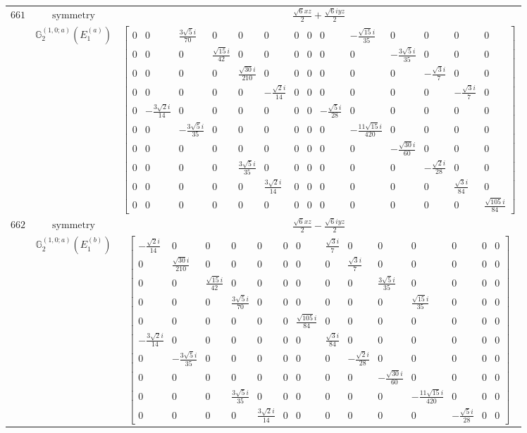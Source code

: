 \documentclass[fleqn,8pt,landscape]{jsarticle}
\begin{document}
\begin{longtable}{ccc}
$ 661 $ & $ \text{symmetry} $ & $ \frac{\sqrt{6} x z}{2} + \frac{\sqrt{6} i y z}{2} $ \\
$  $ & $ \mathbb{G}_{2}^{(1,0;a)}(E_{1}^{(a)}) $ & $ \begin{bmatrix} 0 & 0 & \frac{3 \sqrt{5} i}{70} & 0 & 0 & 0 & 0 & 0 & 0 & - \frac{\sqrt{15} i}{35} & 0 & 0 & 0 & 0 \\ 0 & 0 & 0 & \frac{\sqrt{15} i}{42} & 0 & 0 & 0 & 0 & 0 & 0 & - \frac{3 \sqrt{5} i}{35} & 0 & 0 & 0 \\ 0 & 0 & 0 & 0 & \frac{\sqrt{30} i}{210} & 0 & 0 & 0 & 0 & 0 & 0 & - \frac{\sqrt{3} i}{7} & 0 & 0 \\ 0 & 0 & 0 & 0 & 0 & - \frac{\sqrt{2} i}{14} & 0 & 0 & 0 & 0 & 0 & 0 & - \frac{\sqrt{3} i}{7} & 0 \\ 0 & - \frac{3 \sqrt{2} i}{14} & 0 & 0 & 0 & 0 & 0 & 0 & - \frac{\sqrt{5} i}{28} & 0 & 0 & 0 & 0 & 0 \\ 0 & 0 & - \frac{3 \sqrt{5} i}{35} & 0 & 0 & 0 & 0 & 0 & 0 & - \frac{11 \sqrt{15} i}{420} & 0 & 0 & 0 & 0 \\ 0 & 0 & 0 & 0 & 0 & 0 & 0 & 0 & 0 & 0 & - \frac{\sqrt{30} i}{60} & 0 & 0 & 0 \\ 0 & 0 & 0 & 0 & \frac{3 \sqrt{5} i}{35} & 0 & 0 & 0 & 0 & 0 & 0 & - \frac{\sqrt{2} i}{28} & 0 & 0 \\ 0 & 0 & 0 & 0 & 0 & \frac{3 \sqrt{2} i}{14} & 0 & 0 & 0 & 0 & 0 & 0 & \frac{\sqrt{3} i}{84} & 0 \\ 0 & 0 & 0 & 0 & 0 & 0 & 0 & 0 & 0 & 0 & 0 & 0 & 0 & \frac{\sqrt{105} i}{84} \end{bmatrix} $ \\ \hline
$ 662 $ & $ \text{symmetry} $ & $ \frac{\sqrt{6} x z}{2} - \frac{\sqrt{6} i y z}{2} $ \\
$  $ & $ \mathbb{G}_{2}^{(1,0;a)}(E_{1}^{(b)}) $ & $ \begin{bmatrix} - \frac{\sqrt{2} i}{14} & 0 & 0 & 0 & 0 & 0 & 0 & \frac{\sqrt{3} i}{7} & 0 & 0 & 0 & 0 & 0 & 0 \\ 0 & \frac{\sqrt{30} i}{210} & 0 & 0 & 0 & 0 & 0 & 0 & \frac{\sqrt{3} i}{7} & 0 & 0 & 0 & 0 & 0 \\ 0 & 0 & \frac{\sqrt{15} i}{42} & 0 & 0 & 0 & 0 & 0 & 0 & \frac{3 \sqrt{5} i}{35} & 0 & 0 & 0 & 0 \\ 0 & 0 & 0 & \frac{3 \sqrt{5} i}{70} & 0 & 0 & 0 & 0 & 0 & 0 & \frac{\sqrt{15} i}{35} & 0 & 0 & 0 \\ 0 & 0 & 0 & 0 & 0 & 0 & \frac{\sqrt{105} i}{84} & 0 & 0 & 0 & 0 & 0 & 0 & 0 \\ - \frac{3 \sqrt{2} i}{14} & 0 & 0 & 0 & 0 & 0 & 0 & \frac{\sqrt{3} i}{84} & 0 & 0 & 0 & 0 & 0 & 0 \\ 0 & - \frac{3 \sqrt{5} i}{35} & 0 & 0 & 0 & 0 & 0 & 0 & - \frac{\sqrt{2} i}{28} & 0 & 0 & 0 & 0 & 0 \\ 0 & 0 & 0 & 0 & 0 & 0 & 0 & 0 & 0 & - \frac{\sqrt{30} i}{60} & 0 & 0 & 0 & 0 \\ 0 & 0 & 0 & \frac{3 \sqrt{5} i}{35} & 0 & 0 & 0 & 0 & 0 & 0 & - \frac{11 \sqrt{15} i}{420} & 0 & 0 & 0 \\ 0 & 0 & 0 & 0 & \frac{3 \sqrt{2} i}{14} & 0 & 0 & 0 & 0 & 0 & 0 & - \frac{\sqrt{5} i}{28} & 0 & 0 \end{bmatrix} $ \\ \hline

\end{longtable}
\end{document}
